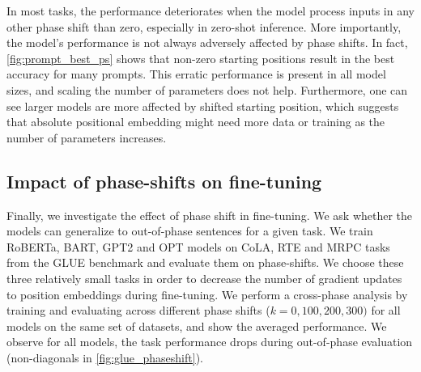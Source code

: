 \documentclass[letterpaper, 12pt]{report}
\begin{document}
In most tasks, the performance deteriorates when the model process inputs in any other phase shift than zero, especially in zero-shot inference.
More importantly, the model's performance is not always adversely affected by phase shifts. In fact, \autoref{fig:prompt_best_ps} shows that non-zero starting positions result in the best accuracy for many prompts.
This erratic performance is present in all model sizes, and scaling the number of parameters does not help.
Furthermore, one can see larger models are more affected by shifted starting position, which suggests that absolute positional embedding might need more data or training as the number of parameters increases.

\subsection{Impact of phase-shifts on fine-tuning}
\label{sec:pos_finetuning}

Finally, we investigate the effect of phase shift in fine-tuning.
We ask whether the models can generalize to out-of-phase sentences for a given task.
We train RoBERTa, BART, GPT2 and OPT models on CoLA, RTE and MRPC tasks from the GLUE benchmark \citep{wang-etal-2018-glue} and evaluate them on phase-shifts.
We choose these three relatively small tasks in order to decrease the number of gradient updates to position embeddings during fine-tuning.
We perform a cross-phase analysis by training and evaluating across different phase shifts ($k={0,100,200,300})$ for all models on the same set of datasets, and show the averaged performance.
We observe for all models, the task performance drops during out-of-phase evaluation (non-diagonals in \autoref{fig:glue_phaseshift}).
\end{document}
